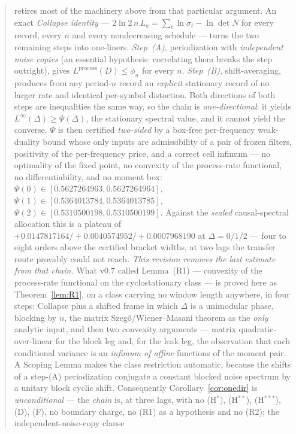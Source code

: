 \documentclass[11pt]{article}
\theoremstyle{definition}
\theoremstyle{remark}
\begin{document}
\begin{abstract}
retires most of the machinery above from that particular argument. An
exact \emph{Collapse identity} --- $2\ln2\,n\,L_a=\sum_t\ln\sigma_t
-\ln\det N$ for every record, every $n$ and every nondecreasing
schedule --- turns the two remaining steps into one-liners.
\emph{Step~(A)}, periodization with \emph{independent noise copies}
(an essential hypothesis: correlating them breaks the step
outright), gives $L^{\mathrm{process}}(D)\le\phi_n$ for every $n$.
\emph{Step~(B)}, shift-averaging, produces from any period-$n$ record
an \emph{explicit} stationary record of no larger rate and identical
per-symbol distortion. Both directions of both steps are inequalities
the same way, so the chain is \emph{one-directional}: it yields
$L^\infty(\Delta)\ge\Psi(\Delta)$, the stationary spectral value, and
it cannot yield the converse. $\Psi$ is then certified
\emph{two-sided} by a box-free per-frequency weak-duality bound whose
only inputs are admissibility of a pair of frozen filters, positivity
of the per-frequency price, and a correct cell infimum --- no
optimality of the fixed point, no convexity of the process-rate
functional, no differentiability, and no moment box:
$\Psi(0)\in[0.5627264963,0.5627264964]$,
$\Psi(1)\in[0.5364013784,0.5364013785]$,
$\Psi(2)\in[0.5310500198,0.5310500199]$. Against the \emph{sealed}
causal-spectral allocation this is a plateau of
$+0.0147817164/+0.0040574952/+0.0007968190$ at $\Delta=0/1/2$ ---
four to eight orders above the certified bracket widths, at two lags
the transfer route provably could not reach.
\emph{This revision removes the last estimate from that chain.} What
v0.7 called Lemma~(R1) --- convexity of the process-rate functional on
the cyclostationary class --- is proved here as
Theorem~\ref{lem:R1}, on a class carrying no window length anywhere,
in four steps: Collapse plus a shifted frame in which $\Delta$ is a
unimodular phase, blocking by $n$, the matrix Szeg\H o/Wiener--Masani
theorem as the \emph{only} analytic input, and then two convexity
arguments --- matrix quadratic-over-linear for the block leg and, for
the leak leg, the observation that each conditional variance is an
\emph{infimum of affine} functions of the moment pair. A Scoping Lemma
makes the class restriction automatic, because the shifts of a
step-(A) periodization conjugate a constant blocked noise spectrum by
a unitary block cyclic shift. Consequently
Corollary~\ref{cor:onedir} is \emph{unconditional} --- the
\emph{chain} is, at three lags, with no (H$^\ast$),
(H$^{\ast\ast}$), (H$^{\ast\ast\ast}$), (D), (F), no boundary charge,
no (R1) as a hypothesis and no (R2); the independent-noise-copy clause

\end{abstract}
\end{document}
